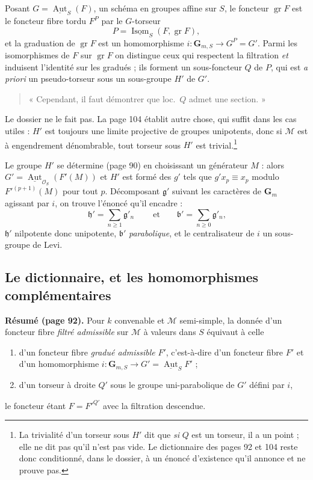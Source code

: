 \documentclass[11pt,a4paper]{article}
\begin{document}
Posant $G = \underline{\operatorname{Aut}}_{S}(F)$, un schéma en groupes affine
sur $S$, le foncteur $\operatorname{gr}F$ est le foncteur fibre tordu
$F^{P}$ par le $G$-torseur
\[
P = \underline{\operatorname{Isom}}_{S}(F, \operatorname{gr}F) ,
\]
et la graduation de $\operatorname{gr}F$ est un homomorphisme
$i \colon \mathbf{G}_{m,S} \to G^{P} = G'$. Parmi les isomorphismes de $F$ sur
$\operatorname{gr}F$ on distingue ceux qui respectent la filtration \emph{et}
induisent l'identité sur les gradués ; ils forment un sous-foncteur $Q$ de $P$,
qui est \emph{a priori} un pseudo-torseur sous un sous-groupe $H'$ de $G'$.
\begin{quote}
« Cependant, il faut démontrer que loc.\ $Q$ admet une section. »
\end{quote}
Le dossier ne le fait pas. La page 104 établit autre chose, qui suffit dans
les cas utiles : $H'$ est toujours une limite projective de
groupes unipotents, donc si $\mathcal{M}$ est à engendrement dénombrable, tout
torseur sous $H'$ est trivial.\footnote{La trivialité d'un torseur sous $H'$ dit que \emph{si} $Q$ est un
torseur, il a un point ; elle ne dit pas qu'il n'est pas vide. Le dictionnaire
des pages 92 et 104 reste donc conditionné, dans le dossier, à un énoncé
d'existence qu'il annonce et ne prouve pas.}

Le groupe $H'$ se détermine (page 90) en choisissant un générateur $M$ : alors
$G' = \underline{\operatorname{Aut}}_{\mathcal{O}_{S}}(F'(M))$ et $H'$ est
formé des $g'$ tels que $g'x_{p} \equiv x_{p}$ modulo $F'^{(p+1)}(M)$ pour tout
$p$. Décomposant $\mathfrak{g}'$ suivant les caractères de $\mathbf{G}_{m}$
agissant par $i$, on trouve l'énoncé qu'il encadre :
\[
\boxed{\ \mathfrak{h}' = \sum_{n \geqslant 1} \mathfrak{g}'_{n}\ }
\qquad\text{et}\qquad
\mathfrak{b}' = \sum_{n \geqslant 0} \mathfrak{g}'_{n} ,
\]
$\mathfrak{h}'$ nilpotente donc unipotente, $\mathfrak{b}'$ \emph{parabolique},
et le centralisateur de $i$ un sous-groupe de Levi.

\subsection*{Le dictionnaire, et les homomorphismes complémentaires}

\textbf{Résumé (page 92).} Pour $k$ convenable et $\mathcal{M}$ semi-simple, la
donnée d'un foncteur fibre \emph{filtré admissible} sur $\mathcal{M}$ à valeurs
dans $S$ équivaut à celle
\begin{enumerate}
\item[(i)] d'un foncteur fibre \emph{gradué admissible} $F'$, c'est-à-dire d'un
foncteur fibre $F'$ et d'un homomorphisme $i \colon \mathbf{G}_{m,S} \to G' =
\underline{\operatorname{Aut}}_{S}F'$ ;
\item[(ii)] d'un torseur à droite $Q'$ sous le groupe uni-parabolique de $G'$
défini par $i$,
\end{enumerate}
le foncteur étant $F = F'^{Q'}$ avec la filtration descendue.
\end{document}
